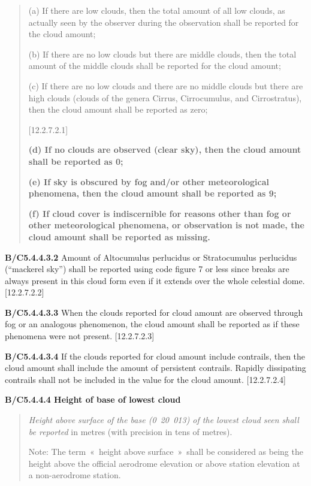 \begin{quote}
(a) If there are low clouds, then the total amount of all low clouds, as actually seen by the observer during the observation shall be reported for the cloud amount;

(b) If there are no low clouds but there are middle clouds, then the total amount of the middle clouds shall be reported for the cloud amount;

(c) If there are no low clouds and there are no middle clouds but there are high clouds (clouds of the genera Cirrus, Cirrocumulus, and Cirrostratus), then the cloud amount shall be reported as zero;

{[}12.2.7.2.1{]}

\textbf{(d) If no clouds are observed (clear sky), then the cloud amount shall be reported as 0;}

\textbf{(e) If sky is obscured by fog and/or other meteorological phenomena, then the cloud amount shall be reported as 9;}

\textbf{(f) If cloud cover is indiscernible for reasons other than fog or other meteorological phenomena, or observation is not made, the cloud amount shall be reported as missing.}
\end{quote}

\textbf{B/C5.4.4.3.2} Amount of Altocumulus perlucidus or Stratocumulus perlucidus (``mackerel sky'') shall be reported using code figure 7 or less since breaks are always present in this cloud form even if it extends over the whole celestial dome. {[}12.2.7.2.2{]}

\textbf{B/C5.4.4.3.3} When the clouds reported for cloud amount are observed through fog or an analogous phenomenon, the cloud amount shall be reported as if these phenomena were not present. {[}12.2.7.2.3{]}

\textbf{B/C5.4.4.3.4} If the clouds reported for cloud amount include contrails, then the cloud amount shall include the amount of persistent contrails. Rapidly dissipating contrails shall not be included in the value for the cloud amount. {[}12.2.7.2.4{]}

\textbf{B/C5.4.4.4 Height of base of lowest cloud}

\begin{quote}
\emph{Height above surface of the base (0~20~013) of the lowest cloud seen shall be reported} in metres (with precision in tens of metres).

Note: The term~«~height above surface~»~shall be considered as being the height above the official aerodrome elevation or above station elevation at a non-aerodrome station.
\end{quote}

